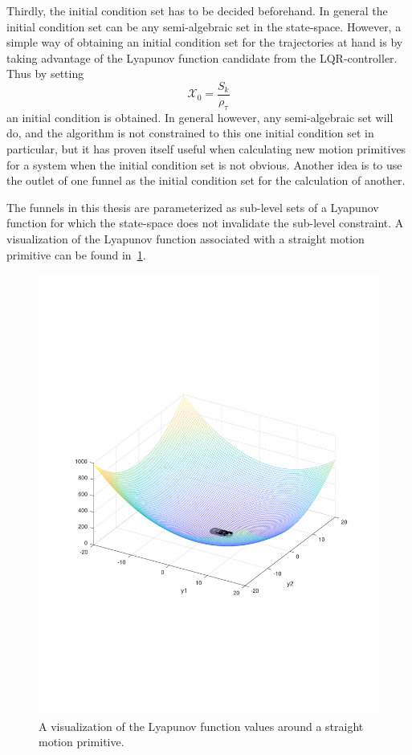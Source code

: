 Thirdly, the initial condition set has to be decided beforehand. In general the
initial condition set can be any semi-algebraic set in the state-space. However,
a simple way of obtaining an initial condition set for the trajectories at hand
is by taking advantage of the Lyapunov function candidate from the
\ac{LQR}-controller. Thus by setting
\begin{equation}
  \mathcal{X}_{0} = \frac{S_{k}}{\rho_{\tau}}
\end{equation}
an initial condition is obtained. In general however, any semi-algebraic set
will do, and the algorithm is not constrained to this one initial condition set
in particular, but it has proven itself useful when calculating new motion
primitives for a system when the initial condition set is not obvious. Another
idea is to use the outlet of one funnel as the initial condition set for the
calculation of another.

The funnels in this thesis are parameterized as sub-level sets of a Lyapunov
function for which the state-space does not invalidate the sub-level constraint.
A visualization of the Lyapunov function associated with a straight motion
primitive can be found in~\cref{fig:visualized-lyapunov}.
\begin{figure}
  \centering
  \includegraphics[scale=.3]{figures/rrtfunnel/straight-funnel-lyapunov-3d}
  \caption{A visualization of the Lyapunov function values around a straight
    motion primitive.}
  \label{fig:visualized-lyapunov}
\end{figure}

